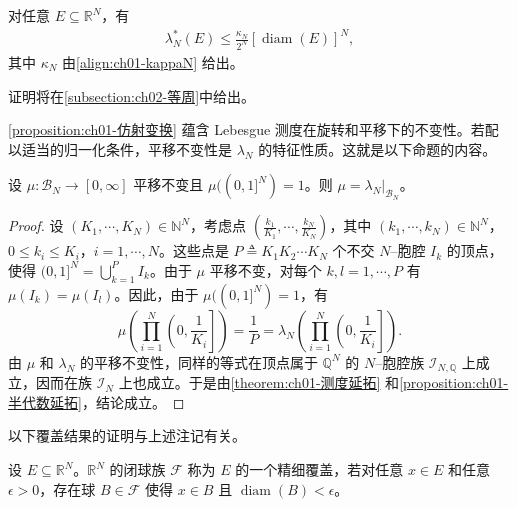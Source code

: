 \documentclass[../../main.tex]{subfiles}%
\begin{document}
\begin{proposition}[等直径不等式]\label{proposition:ch01-等直径}\label{proposition:ch01-等直径不等式}
\label{remark:ch01-等直径注}
对任意 $E\subseteq\mathbb{R}^N$，有
\begin{align}
\lambda_N^*(E)\leqslant\frac{\kappa_N}{2^N}[\operatorname{diam}(E)]^N, \label{align:ch01-等直径}
\end{align}
其中 $\kappa_N$ 由\eqref{align:ch01-kappaN} 给出。
\end{proposition}
\begin{remark}
证明将在\cref{subsection:ch02-等周}中给出。
\end{remark}

\cref{proposition:ch01-仿射变换} 蕴含 Lebesgue 测度在旋转和平移下的不变性。若配以适当的归一化条件，平移不变性是 $\lambda_N$ 的特征性质。这就是以下命题的内容。

\begin{proposition}\label{proposition:ch01-平移不变刻画}
设 $\mu:\mathcal{B}_N\to[0,\infty]$ 平移不变且 $\mu((0,1]^N)=1$。则 $\mu=\lambda_N|_{\mathcal{B}_N}$。
\end{proposition}

\begin{proof}
设 $(K_1,\cdots ,K_N)\in\mathbb{N}^N$，考虑点 $\left(\frac{k_1}{K_1},\cdots ,\frac{k_N}{K_N}\right)$，其中 $(k_1,\cdots ,k_N)\in\mathbb{N}^N$，$0\leqslant k_i\leqslant K_i$，$i=1,\cdots ,N$。这些点是 $P\triangleq K_1K_2\cdots K_N$ 个不交 $N$--胞腔 $I_k$ 的顶点，使得 $(0,1]^N=\bigcup_{k=1}^P I_k$。由于 $\mu$ 平移不变，对每个 $k,l=1,\cdots ,P$ 有 $\mu(I_k)=\mu(I_l)$。因此，由于 $\mu((0,1]^N)=1$，有
\[
\mu\left(\prod_{i=1}^N\left(0,\frac{1}{K_i}\right]\right)=\frac{1}{P}=\lambda_N\left(\prod_{i=1}^N\left(0,\frac{1}{K_i}\right]\right).
\]
由 $\mu$ 和 $\lambda_N$ 的平移不变性，同样的等式在顶点属于 $\mathbb{Q}^N$ 的 $N$--胞腔族 $\mathcal{I}_{N,\mathbb{Q}}$ 上成立，因而在族 $\mathcal{I}_N$ 上也成立。于是由\cref{theorem:ch01-测度延拓} 和\cref{proposition:ch01-半代数延拓}，结论成立。
\end{proof}

以下覆盖结果的证明与上述注记有关。

\begin{definition}\label{definition:ch01-精细覆盖}
设 $E\subseteq\mathbb{R}^N$。$\mathbb{R}^N$ 的闭球族 $\mathcal{F}$ 称为 $E$ 的一个精细覆盖，若对任意 $x\in E$ 和任意 $\epsilon>0$，存在球 $B\in\mathcal{F}$ 使得 $x\in B$ 且 $\operatorname{diam}(B)<\epsilon$。
\end{definition}
\end{document}
